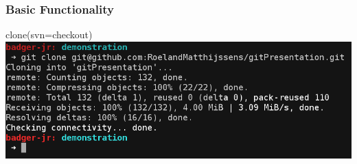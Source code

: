 \begin{frame}
	\frametitle{Basic Functionality}
	\begin{block}{clone(svn=checkout)}
		\includegraphics[width=\textwidth]{./images/clone.png}
	\end{block}
\end{frame}
